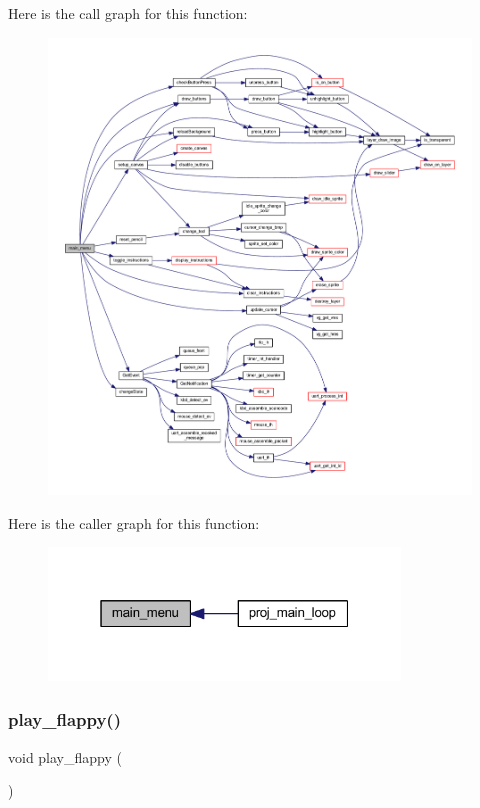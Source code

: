 Here is the call graph for this function\+:
\nopagebreak
\begin{figure}[H]
\begin{center}
\leavevmode
\includegraphics[width=350pt]{group__pengoo_ga885611589f6294afada89fe88362e863_cgraph}
\end{center}
\end{figure}
Here is the caller graph for this function\+:\nopagebreak
\begin{figure}[H]
\begin{center}
\leavevmode
\includegraphics[width=265pt]{group__pengoo_ga885611589f6294afada89fe88362e863_icgraph}
\end{center}
\end{figure}
\mbox{\label{group__pengoo_ga2ef126f11a398bb34f581d5eca368e6b}} 
\subsubsection{\texorpdfstring{play\+\_\+flappy()}{play\_flappy()}}
{\footnotesize\ttfamily void play\+\_\+flappy (\begin{DoxyParamCaption}{ }\end{DoxyParamCaption})}



